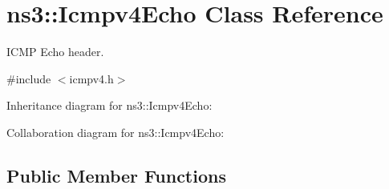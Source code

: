 \hypertarget{classns3_1_1Icmpv4Echo}{}\section{ns3\+:\+:Icmpv4\+Echo Class Reference}
\label{classns3_1_1Icmpv4Echo}


I\+C\+MP Echo header.  




{\ttfamily \#include $<$icmpv4.\+h$>$}



Inheritance diagram for ns3\+:\+:Icmpv4\+Echo\+:


Collaboration diagram for ns3\+:\+:Icmpv4\+Echo\+:
\subsection*{Public Member Functions}
